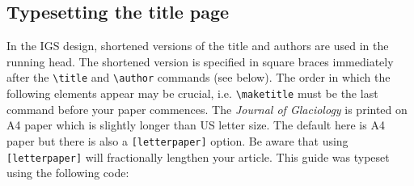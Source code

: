 \documentclass[review,oneside]{igs}
\begin{document}
\subsection{Typesetting the title page}

In the IGS design, shortened versions of the title and authors are used in the running head. The shortened version is specified in square braces immediately after the \verb"\title" and \verb"\author" commands (see below). The order in which the following elements appear may be crucial, i.e. \verb"\maketitle" must be the last command before your paper commences. 
The \emph{Journal of Glaciology} is printed on A4 paper which is slightly longer than US letter size. The default here is A4 paper but there is also a \verb"[letterpaper]" option. Be aware that using \verb"[letterpaper]" will fractionally lengthen your article. This guide was typeset using the following code:
\end{document}
